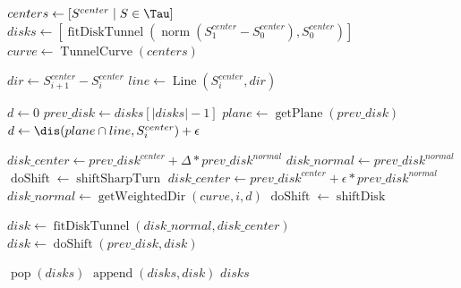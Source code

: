 \begin{algorithmic}[1]
\label{alg:digTunnel}

    \State $ centers \gets [ S^{center} \mid S \in \Tau ] $ \label{digTunnel:first_init}
    \
    \State $ disks \gets   [ \operatorname{fitDiskTunnel}(\operatorname{norm}(S_{1}^{center} - S_{0}^{center}), S_0^{center})] $
    \State $ curve \gets \operatorname{TunnelCurve}(centers) $ \label{digTunnel:last_init}
    \Statex

            \Break
        \EndIf
        \State $ dir \gets S_{i + 1}^{center} - S_{i}^{center} $
        \State $ line \gets \operatorname{Line}(S_{i}^{center}, dir) $
        \Statex

        \State $ d \gets 0 $
            \State $ prev\_disk \gets disks[|disks|-1] $
            \State $ plane \gets \operatorname{getPlane}(prev\_disk) $
            \State $ d \gets \dis(plane \cap line, S_{i}^{center}) + \epsilon  $
            \If {$ d > \norm{dir} $} \label{digTunnel:while_condition}
                \Break
            \EndIf
            \Statex

                \State $ disk\_center
                    \gets prev\_disk^{center} + \Delta * prev\_disk^{normal} $ \label{alg:shift_by_delta}
                \State $ disk\_normal \gets prev\_disk^{normal} $   \label{alg:same_normal}
                \State $ \operatorname{doShift} \gets \operatorname{shiftSharpTurn} $
            \Else
                \State $ disk\_center \gets prev\_disk^{center} + \epsilon * prev\_disk^{normal} $
                \State $ disk\_normal \gets \operatorname{getWeightedDir}(curve, i, d) $
                \State $ \operatorname{doShift} \gets \operatorname{shiftDisk} $
            \EndIf

            \State $ disk \gets \operatorname{fitDiskTunnel}(disk\_normal, disk\_center) $ \label{alg:fit_disk}
            \State $ disk \gets \operatorname{doShift}(prev\_disk, disk) $ \label{alg:shift_disk}

             \label{digTunnel:last_if}
                \State $ \operatorname{pop}(disks)  $ \label{digTunnel:last_if_end}
            \EndIf
            \State $ \operatorname{append}(disks, disk) $
        \EndWhile
    \EndFor
    \State \Return $ disks $
\EndFunction

\end{algorithmic}

